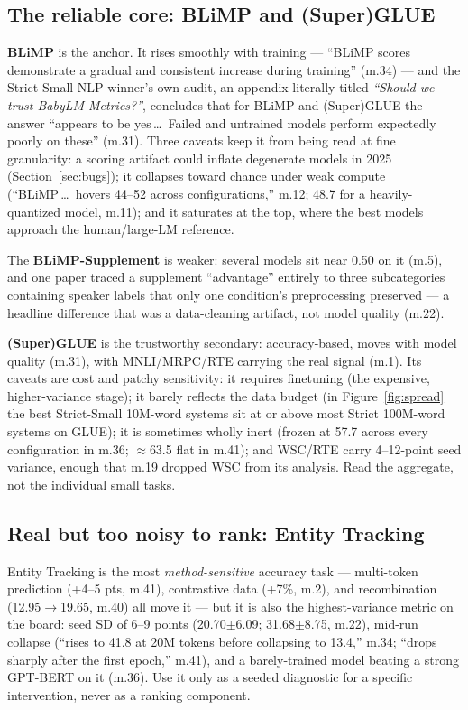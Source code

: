 \documentclass[11pt]{article}
\begin{document}
\subsection{The reliable core: BLiMP and (Super)GLUE}
\textbf{BLiMP} is the anchor. It rises smoothly with training --- ``BLiMP scores demonstrate a
gradual and consistent increase during training'' (m.34) --- and the Strict-Small NLP winner's
own audit, an appendix literally titled \emph{``Should we trust BabyLM Metrics?''}, concludes
that for BLiMP and (Super)GLUE the answer ``appears to be yes\,\dots\ Failed and untrained
models perform expectedly poorly on these'' (m.31). Three caveats keep it from being read at
fine granularity: a scoring artifact could inflate degenerate models in 2025
(Section~\ref{sec:bugs}); it collapses toward chance under weak compute (``BLiMP\,\dots\ hovers
44--52 across configurations,'' m.12; 48.7 for a heavily-quantized model, m.11); and it saturates
at the top, where the best models approach the human/large-LM reference.

The \textbf{BLiMP-Supplement} is weaker: several models sit near 0.50 on it (m.5), and one paper
traced a supplement ``advantage'' entirely to three subcategories containing speaker labels that
only one condition's preprocessing preserved --- a headline difference that was a data-cleaning
artifact, not model quality (m.22).

\textbf{(Super)GLUE} is the trustworthy secondary: accuracy-based, moves with model quality
(m.31), with MNLI/MRPC/RTE carrying the real signal (m.1). Its caveats are cost and patchy
sensitivity: it requires finetuning (the expensive, higher-variance stage); it barely reflects the data
budget (in Figure~\ref{fig:spread} the best Strict-Small 10M-word systems sit at or above most Strict
100M-word systems on GLUE); it is sometimes wholly inert (frozen at 57.7 across every configuration in m.36; $\approx$63.5
flat in m.41); and WSC/RTE carry 4--12-point seed variance, enough that m.19 dropped WSC from its
analysis. Read the aggregate, not the individual small tasks.

\subsection{Real but too noisy to rank: Entity Tracking}
Entity Tracking is the most \emph{method-sensitive} accuracy task --- multi-token prediction
(+4--5 pts, m.41), contrastive data (+7\%, m.2), and recombination (12.95$\to$19.65, m.40) all
move it --- but it is also the highest-variance metric on the board: seed SD of 6--9 points
(20.70$\pm$6.09; 31.68$\pm$8.75, m.22), mid-run collapse (``rises to 41.8 at 20M tokens before
collapsing to 13.4,'' m.34; ``drops sharply after the first epoch,'' m.41), and a barely-trained
model beating a strong GPT-BERT on it (m.36). Use it only as a seeded diagnostic for a specific
intervention, never as a ranking component.
\end{document}
